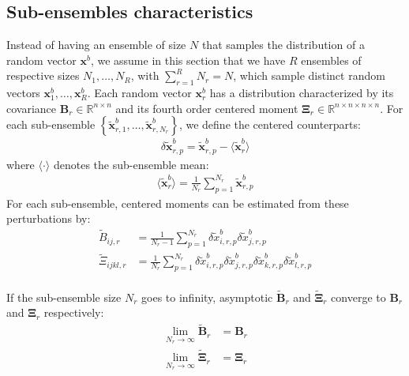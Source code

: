 \documentclass[12pt]{scrartcl}
\begin{document}
\subsection{Sub-ensembles characteristics}
Instead of having an ensemble of size $N$ that samples the distribution of a random vector $\mathbf{x}^b$, we assume in this section that we have $R$ ensembles of respective sizes $N_1,\dots,N_R$, with $\sum_{r=1}^R N_r = N$, which sample distinct random vectors $\mathbf{x}^b_1,\dots,\mathbf{x}^b_R$. Each random vector $\mathbf{x}^b_r$ has a distribution characterized by its covariance $\mathbf{B}_r \in \mathbb{R}^{n \times n}$ and its fourth order centered moment $\boldsymbol{\Xi}_r \in \mathbb{R}^{n \times n \times n \times n}$. For each sub-ensemble $\left\{\widetilde{\mathbf{x}}^b_{r,1},\dots,\widetilde{\mathbf{x}}^b_{r,N_r}\right\}$, we define the centered counterparts:
\begin{align}
\delta \widetilde{\mathbf{x}}^b_{r,p} = \widetilde{\mathbf{x}}^b_{r,p} - \langle \widetilde{\mathbf{x}}^b _r\rangle
\end{align}
where $\langle \cdot \rangle$ denotes the sub-ensemble mean:
\begin{align}
\langle \widetilde{\mathbf{x}}^b_r \rangle = \frac{1}{N_r} \sum_{p=1}^{N_r} \widetilde{\mathbf{x}}^b_{r,p}
\end{align}
For each sub-ensemble, centered moments can be estimated from these perturbations by:
\begin{subequations}
\begin{align}
\widetilde{B}_{ij,r} & = \frac{1}{N_r-1} \sum_{p=1}^{N_r} \delta \widetilde{x}^b_{i,r,p} \delta \widetilde{x}^b_{j,r,p}  \\
\widetilde{\Xi}_{ijkl,r} & = \frac{1}{N_r} \sum_{p=1}^{N_r} \delta \widetilde{x}^b_{i,r,p} \delta \widetilde{x}^b_{j,r,p} \delta \widetilde{x}^b_{k,r,p} \delta \widetilde{x}^b_{l,r,p}
\end{align}
\end{subequations}
$  $\\
If the sub-ensemble size $N_r$ goes to infinity, asymptotic $\widetilde{\mathbf{B}}_r$ and $\widetilde{\boldsymbol{\Xi}}_r$ converge to $\mathbf{B}_r$ and $\boldsymbol{\Xi}_r$ respectively:
\begin{subequations}
\begin{align}
\lim_{N_r \rightarrow \infty} \widetilde{\mathbf{B}}_r & = \mathbf{B}_r \\
\lim_{N_r \rightarrow \infty} \widetilde{\boldsymbol{\Xi}}_r & = \boldsymbol{\Xi}_r
\end{align}
\end{subequations}
\end{document}
